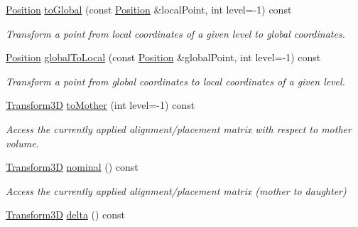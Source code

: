 \begin{DoxyCompactItemize}
\hyperlink{class_d_d4hep_1_1_alignments_1_1_global_alignment_a9cd5167ec3a33a95ca76a9c7fe06271e}{Position} \hyperlink{class_d_d4hep_1_1_alignments_1_1_global_alignment_a6a3729f431459bb1592c1760581fd2ce}{to\+Global} (const \hyperlink{class_d_d4hep_1_1_alignments_1_1_global_alignment_a9cd5167ec3a33a95ca76a9c7fe06271e}{Position} \&local\+Point, int level=-\/1) const
\begin{DoxyCompactList}\small\item\em Transform a point from local coordinates of a given level to global coordinates. \end{DoxyCompactList}\item 
\hyperlink{class_d_d4hep_1_1_alignments_1_1_global_alignment_a9cd5167ec3a33a95ca76a9c7fe06271e}{Position} \hyperlink{class_d_d4hep_1_1_alignments_1_1_global_alignment_a2210d7d04dd715afa45c35fbbaa0c601}{global\+To\+Local} (const \hyperlink{class_d_d4hep_1_1_alignments_1_1_global_alignment_a9cd5167ec3a33a95ca76a9c7fe06271e}{Position} \&global\+Point, int level=-\/1) const
\begin{DoxyCompactList}\small\item\em Transform a point from global coordinates to local coordinates of a given level. \end{DoxyCompactList}\item 
\hyperlink{class_d_d4hep_1_1_alignments_1_1_global_alignment_a328240cbc53ba92424336a5898ba49d3}{Transform3D} \hyperlink{class_d_d4hep_1_1_alignments_1_1_global_alignment_af4439ae3b62095d9388fc32023e00a95}{to\+Mother} (int level=-\/1) const
\begin{DoxyCompactList}\small\item\em Access the currently applied alignment/placement matrix with respect to mother volume. \end{DoxyCompactList}\item 
\hyperlink{class_d_d4hep_1_1_alignments_1_1_global_alignment_a328240cbc53ba92424336a5898ba49d3}{Transform3D} \hyperlink{class_d_d4hep_1_1_alignments_1_1_global_alignment_a85c1483a3003d77e1006b9c81ae0801d}{nominal} () const
\begin{DoxyCompactList}\small\item\em Access the currently applied alignment/placement matrix (mother to daughter) \end{DoxyCompactList}\item 
\hyperlink{class_d_d4hep_1_1_alignments_1_1_global_alignment_a328240cbc53ba92424336a5898ba49d3}{Transform3D} \hyperlink{class_d_d4hep_1_1_alignments_1_1_global_alignment_a347c222bf992dbf1b5b318b43069d789}{delta} () const

\end{DoxyCompactItemize}

